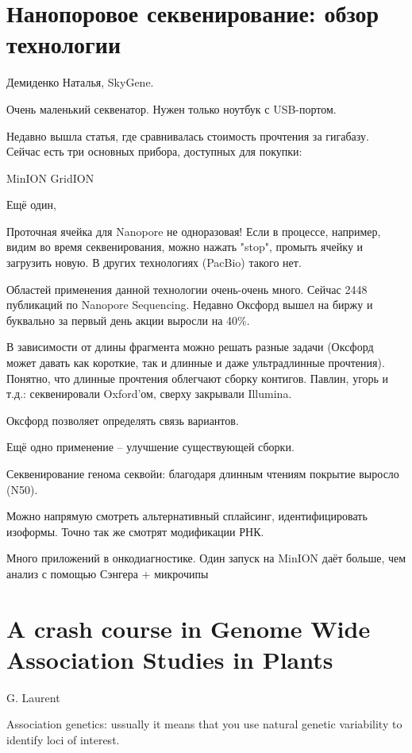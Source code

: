 \documentclass[main.tex]{subfiles}
\begin{document}
\section{Нанопоровое секвенирование: обзор технологии}

Демиденко Наталья, SkyGene.

Очень маленький секвенатор.
Нужен только ноутбук с USB-портом.

Недавно вышла статья, где сравнивалась стоимость прочтения за гигабазу.
Сейчас есть три основных прибора, доступных для покупки:

MinION
GridION

Ещё один,

Проточная ячейка для Nanopore не одноразовая!
Если в процессе, например, видим во время секвенирования, можно нажать "stop", промыть ячейку и загрузить новую.
В других технологиях (PacBio) такого нет.

Областей применения данной технологии очень-очень много.
Сейчас 2448 публикаций по Nanopore Sequencing.
Недавно Оксфорд вышел на биржу и буквально за первый день акции выросли на 40\%.

В зависимости от длины фрагмента можно решать разные задачи (Оксфорд может давать как короткие, так и длинные и даже ультрадлинные прочтения).
Понятно, что длинные прочтения облегчают сборку контигов.
Павлин, угорь и т.д.: секвенировали Oxford'ом, сверху закрывали Illumina.

Оксфорд позволяет определять связь вариантов.

Ещё одно применение -- улучшение существующей сборки.

Секвенирование генома секвойи: благодаря длинным чтениям покрытие выросло (N50).

Можно напрямую смотреть альтернативный сплайсинг, идентифицировать изоформы.
Точно так же смотрят модификации РНК.

Много приложений в онкодиагностике.
Один запуск на MinION даёт больше, чем анализ с помощью Сэнгера + микрочипы


\section{A crash course in Genome Wide Association Studies in Plants}

G. Laurent

Association genetics: ussually it means that you use natural genetic variability to identify loci of interest.
\end{document}
